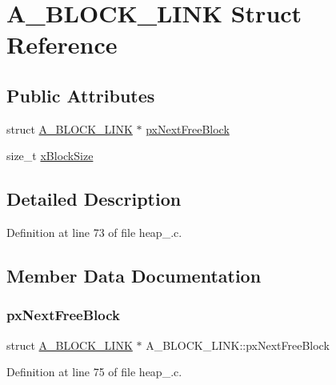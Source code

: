 \hypertarget{structA__BLOCK__LINK}{}\section{A\+\_\+\+B\+L\+O\+C\+K\+\_\+\+L\+I\+NK Struct Reference}
\label{structA__BLOCK__LINK}
\subsection*{Public Attributes}
\begin{DoxyCompactItemize}
\item 
struct \hyperlink{structA__BLOCK__LINK}{A\+\_\+\+B\+L\+O\+C\+K\+\_\+\+L\+I\+NK} $\ast$ \hyperlink{structA__BLOCK__LINK_aaef1b26e95b0b7b7ebffc91fa6ce874f}{px\+Next\+Free\+Block}
\item 
size\+\_\+t \hyperlink{structA__BLOCK__LINK_ad5dcf5df03d8be6186c567be9e2c657b}{x\+Block\+Size}
\end{DoxyCompactItemize}


\subsection{Detailed Description}


Definition at line 73 of file heap\+\_.\+c.



\subsection{Member Data Documentation}
\mbox{\label{structA__BLOCK__LINK_aaef1b26e95b0b7b7ebffc91fa6ce874f}} 
\subsubsection{\texorpdfstring{px\+Next\+Free\+Block}{pxNextFreeBlock}}
{\footnotesize\ttfamily struct \hyperlink{structA__BLOCK__LINK}{A\+\_\+\+B\+L\+O\+C\+K\+\_\+\+L\+I\+NK} $\ast$ A\+\_\+\+B\+L\+O\+C\+K\+\_\+\+L\+I\+N\+K\+::px\+Next\+Free\+Block}



Definition at line 75 of file heap\+\_.\+c.

